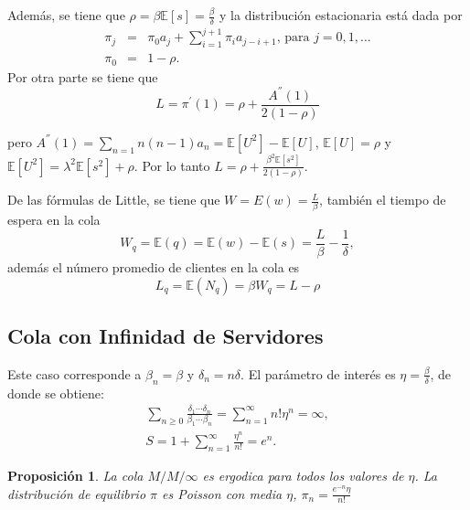 \documentclass{article}
\newtheorem{Prop}{Proposición}[section]
\newcommand{\esp}{\mathbb{E}}
\numberwithin{equation}{section}
\begin{document}
Adem\'as, se tiene que $\rho=\beta\esp\left[s\right]=\frac{\beta}{\delta}$ y la distribuci\'on estacionaria est\'a dada por
\begin{eqnarray}
\pi_{j}&=&\pi_{0}a_{j}+\sum_{i=1}^{j+1}\pi_{i}a_{j-i+1}\textrm{, para }j=0,1,\ldots\\
\pi_{0}&=&1-\rho.
\end{eqnarray}
Por otra parte se tiene que\begin{equation}
L=\pi^{'}\left(1\right)=\rho+\frac{A^{''}\left(1\right)}{2\left(1-\rho\right)}
\end{equation}

pero $A^{''}\left(1\right)=\sum_{n=1}n\left(n-1\right)a_{n}= \esp\left[U^{2}\right]-\esp\left[U\right]$, $\esp\left[U\right]=\rho$ y
$\esp\left[U^{2}\right]=\lambda^{2}\esp\left[s^{2}\right]+\rho$.
Por lo tanto $L=\rho+\frac{\beta^{2}\esp\left[s^{2}\right]}{2\left(1-\rho\right)}$.

De las f\'ormulas de Little, se tiene que $W=E\left(w\right)=\frac{L}{\beta}$, tambi\'en el tiempo de espera en la cola
\begin{equation}
W_{q}=\esp\left(q\right)=\esp\left(w\right)-\esp\left(s\right)=\frac{L}{\beta}-\frac{1}{\delta},
\end{equation}
adem\'as el n\'umero promedio de clientes en la cola es
\begin{equation}
L_{q}=\esp\left(N_{q}\right)=\beta W_{q}=L-\rho
\end{equation}


\subsection{Cola con Infinidad de Servidores}

Este caso corresponde a $\beta_{n}=\beta$ y $\delta_{n}=n\delta$. El par\'ametro de inter\'es es $\eta=\frac{\beta}{\delta}$, de donde se obtiene:
\begin{eqnarray*}
\sum_{n\geq0}\frac{\delta_{1}\cdots\delta_{n}}{\beta_{1}\cdots\beta_{n}}=\sum_{n=1}^{\infty}n!\eta^{n}=\infty,\\
S=1+\sum_{n=1}^{\infty}\frac{\eta^{n}}{n!}=e^{n}.
\end{eqnarray*}

\begin{Prop}
La cola $M/M/\infty$ es ergodica para todos los valores de $\eta$. La distribuci\'on de equilibrio $\pi$ es Poisson con media $\eta$, $\pi_{n}=\frac{e^{-n}\eta}{n!}$
\end{Prop}







\printindex
\end{document}
